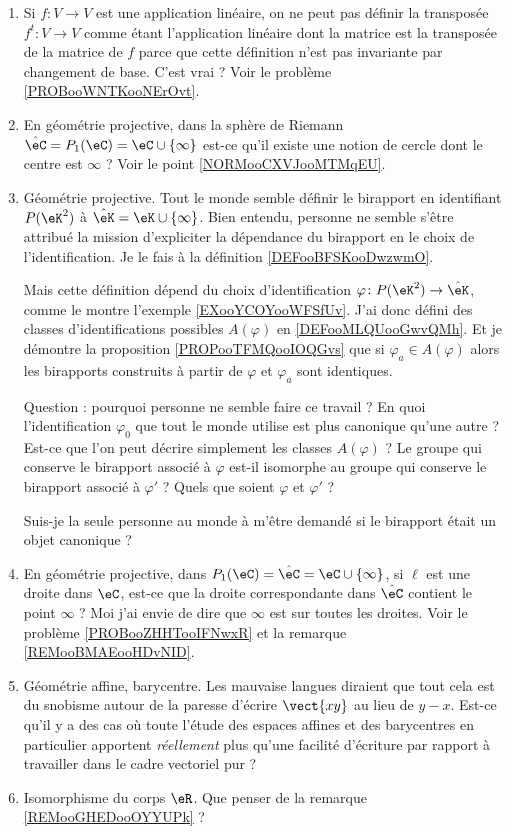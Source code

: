 \begin{enumerate}
    \item
        Si \( f\colon V\to V\) est une application linéaire, on ne peut pas définir la transposée \( f^t\colon V\to V\) comme étant l'application linéaire dont la matrice est la transposée de la matrice de \( f\) parce que cette définition n'est pas invariante par changement de base. C'est vrai ? Voir le problème \ref{PROBooWNTKooNErOvt}.
    \item
        En géométrie projective, dans la sphère de Riemann \( \hat\eC=P_1(\eC)=\eC\cup\{ \infty \}\) est-ce qu'il existe une notion de cercle dont le centre est \( \infty\) ? Voir le point \ref{NORMooCXVJooMTMqEU}.
    \item
        Géométrie projective. Tout le monde semble définir le birapport en identifiant \( P(\eK^2)\) à \( \hat\eK=\eK\cup\{ \infty \}\). Bien entendu, personne ne semble s'être attribué la mission d'expliciter la dépendance du birapport en le choix de l'identification. Je le fais à la définition \ref{DEFooBFSKooDwzwmO}.

        Mais cette définition dépend du choix d'identification \( \varphi\colon P(\eK^2)\to \hat\eK\), comme le montre l'exemple \ref{EXooYCOYooWFSfUv}. J'ai donc défini des classes d'identifications possibles \( A(\varphi)\) en \ref{DEFooMLQUooGwvQMh}. Et je démontre la proposition \ref{PROPooTFMQooIOQGvs} que si \( \varphi_a\in A(\varphi)\) alors les birapports construits à partir de \( \varphi\) et \( \varphi_a\) sont identiques.

        Question : pourquoi personne ne semble faire ce travail ? En quoi l'identification \( \varphi_0\) que tout le monde utilise est plus canonique qu'une autre ? Est-ce que l'on peut décrire simplement les classes \( A(\varphi)\) ? Le groupe qui conserve le birapport associé à \( \varphi\) est-il isomorphe au groupe qui conserve le birapport associé à \( \varphi'\) ? Quels que soient \( \varphi\) et \( \varphi'\) ?

        Suis-je la seule personne au monde à m'être demandé si le birapport était un objet canonique ?
    \item
        En géométrie projective, dans \( P_1(\eC)=\hat\eC=\eC\cup\{ \infty \}\), si \( \ell\) est une droite dans \( \eC\), est-ce que la droite correspondante dans \( \hat\eC\) contient le point \( \infty\) ? Moi j'ai envie de dire que \( \infty\) est sur toutes les droites. Voir le problème \ref{PROBooZHHTooIFNwxR} et la remarque \ref{REMooBMAEooHDvNID}.

    \item
        Géométrie affine, barycentre. Les mauvaise langues diraient que tout cela est du snobisme autour de la paresse d'écrire \( \vect{ xy }\) au lieu de \( y-x\). Est-ce qu'il y a des cas où toute l'étude des espaces affines et des barycentres en particulier apportent \emph{réellement} plus qu'une facilité d'écriture par rapport à travailler dans le cadre vectoriel pur ?
    \item
        Isomorphisme du corps \( \eR\). Que penser de la remarque \ref{REMooGHEDooOYYUPk} ?
\end{enumerate}

